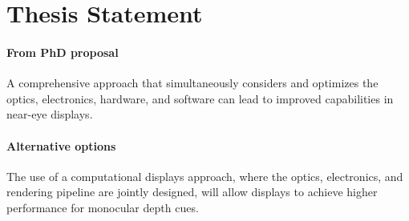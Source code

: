 \section{Thesis Statement}

\paragraph{From PhD proposal}
A comprehensive approach that simultaneously considers and optimizes the optics, electronics, hardware, and software can lead to improved capabilities in near-eye displays.



\paragraph{Alternative options}
\begin{compact_itemize}
\item The use of a computational displays approach, where the optics, electronics, and rendering pipeline are jointly designed, will allow displays to achieve higher performance for monocular depth cues. 
\end{compact_itemize}